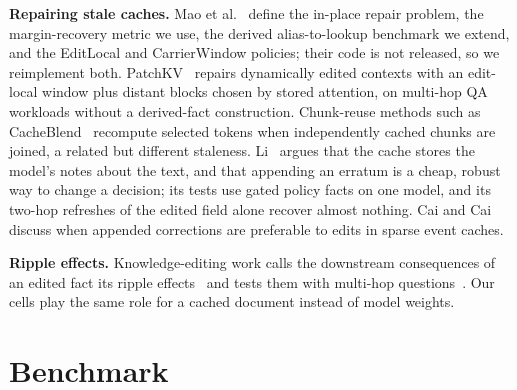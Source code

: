 \documentclass[conference]{IEEEtran}
\begin{document}
\textbf{Repairing stale caches.} Mao et al.~\cite{mao2026contiguity} define the in-place repair problem, the
margin-recovery metric we use, the derived alias-to-lookup benchmark we extend, and the EditLocal and
CarrierWindow policies; their code is not released, so we reimplement both. PatchKV~\cite{yang2026patchkv}
repairs dynamically edited contexts with an edit-local window plus distant blocks chosen by stored attention, on
multi-hop QA workloads without a derived-fact construction. Chunk-reuse methods such as
CacheBlend~\cite{yao2025cacheblend} recompute selected tokens when independently cached chunks are joined, a
related but different staleness. Li~\cite{li2026programmable} argues that the cache stores the model's notes
about the text, and that appending an erratum is a cheap, robust way to change a decision; its tests use gated
policy facts on one model, and its two-hop refreshes of the edited field alone recover almost nothing. Cai and
Cai~\cite{cai2026eventkv} discuss when appended corrections are preferable to edits in sparse event caches.

\textbf{Ripple effects.} Knowledge-editing work calls the downstream consequences of an edited fact its ripple
effects~\cite{cohen2024ripple} and tests them with multi-hop questions~\cite{zhong2023mquake}. Our cells play
the same role for a cached document instead of model weights.

\section{Benchmark}
\label{sec:bench}
\end{document}
